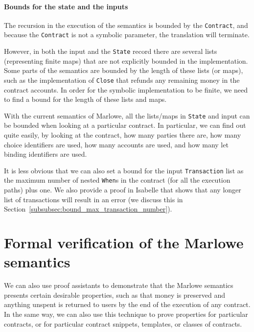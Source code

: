 \documentclass[runningheads]{llncs}
\begin{document}
\paragraph{Bounds for the state and the inputs}

The recursion in the execution of the semantics is bounded by the \texttt{Contract}, and because the \texttt{Contract} is not a symbolic parameter, the translation will terminate.

However, in both the input and the \texttt{State} record there are several lists (representing finite maps) that are not explicitly bounded in the implementation. Some parts of the semantics are bounded by the length of these lists (or maps), such as the implementation of \texttt{Close} that refunds any remaining money in the contract accounts.
In order for the symbolic implementation to be finite, we need to find a bound for the length of these lists and maps.

With the current semantics of Marlowe, all the lists/maps in \texttt{State} and input can be bounded when looking at a particular contract. In particular, we can find out quite easily, by looking at the contract, how many parties there are, how many choice identifiers are used, how many accounts are used, and how many let binding identifiers are used.

It is less obvious that we can also set a bound for the input \texttt{Transaction} list as the maximum number of nested \texttt{When}s in the contract (for all the execution paths) plus one. We also provide a proof in Isabelle that shows that any longer list of transactions will result in an error (we discuss this in Section~\ref{subsubsec:bound_max_transaction_number}).

\section{Formal verification of the Marlowe semantics\label{sec:verification}}

We can also use proof assistants to demonstrate that the Marlowe semantics presents certain desirable properties, such as that money is preserved and anything unspent is returned to users by the end of the execution of any contract. In the same way, we can also use this technique to prove properties for particular contracts, or for particular contract snippets, templates, or classes of contracts.
\end{document}
